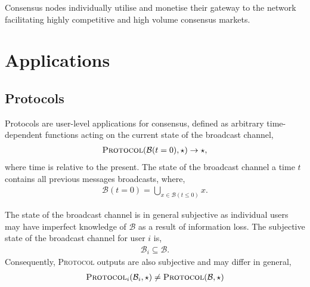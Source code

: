 \documentclass[twocolumn, aps, amsmath, amssymb, nofootinbib, superscriptaddress, longbibliography, floatfix, eqsecnum, rmp]{revtex4-2}
\begin{document}






Consensus nodes individually utilise and monetise their gateway to the network facilitating highly competitive and high volume consensus markets.

\section{Applications} \label{sec:applications}

\subsection{Protocols}

Protocols are user-level applications for consensus, defined as arbitrary time-dependent functions acting on the current state of the broadcast channel,
\begin{align}
	\textsc{Protocol}(\mathcal{B}(t=0),\star)\to \star,
\end{align}
where time is relative to the present. The state of the broadcast channel a time $t$ contains all previous messages broadcasts,
 where,
\begin{align}
	\mathcal{B}(t=0) = \bigcup_{x\in \mathcal{B}(t\leq 0)} x.
\end{align}

The state of the broadcast channel is in general subjective as individual users may have imperfect knowledge of $\mathcal{B}$ as a result of information loss. The subjective state of the broadcast channel for user $i$ is,
\begin{align}
	\mathcal{B}_i \subseteq \mathcal{B}.
\end{align}
Consequently, \textsc{Protocol} outputs are also subjective and may differ in general,
\begin{align}
	\textsc{Protocol}_i(\mathcal{B}_i,\star) \neq \textsc{Protocol}(\mathcal{B},\star)
\end{align}
\end{document}
